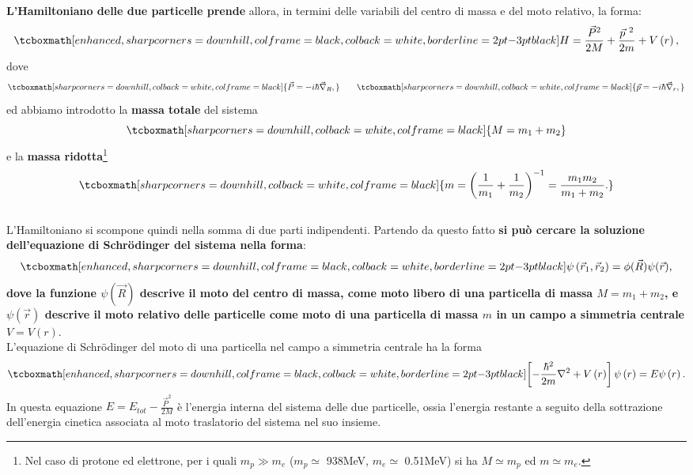 \textbf{L'Hamiltoniano delle due particelle prende} allora, in termini delle variabili del centro di massa e del moto relativo, la forma:
	\begin{equation}
		\tcboxmath[enhanced, sharp corners=downhill, colframe=black, colback=white, borderline={2pt}{-3pt}{black}]{
			H=\frac{\vec{P}^{2}}{2M}+\frac{\vec{p}^{\ 2}}{2m}+V\left(r\right) , 
			}
	\end{equation}
dove
	\begin{equation}
		\tcboxmath[sharp corners=downhill, colback=white, colframe=black]{
			\vec{P}=-i\hbar\vec{\nabla}_R,
			} \qquad
		\tcboxmath[sharp corners=downhill, colback=white, colframe=black]{
			\vec{p}=-i\hbar\vec{\nabla}_r ,
			}
\end{equation}
ed abbiamo introdotto la \textbf{massa totale} del sistema
	\begin{equation}
		\tcboxmath[sharp corners=downhill, colback=white, colframe=black]{
			M=m_1+m_2
			}
	\end{equation}
e la \textbf{massa ridotta}\footnote{Nel caso di protone ed elettrone, per i quali $m_p \gg m_e$ ($m_p \simeq$ 938MeV, $m_e\simeq$ 0.51MeV) si ha $M\simeq m_p$ ed $m\simeq m_e$.}
	\begin{equation}
		\tcboxmath[sharp corners=downhill, colback=white, colframe=black]{
			m=\left(\frac{1}{m_1}+\frac{1}{m_2}\right)^{-1}=\frac{m_1m_2}{m_1+m_2}.
			}
	\end{equation}\\
	
L'Hamiltoniano si scompone quindi nella somma di due parti indipendenti. Partendo da questo fatto \textbf{si può cercare la soluzione dell'equazione di Schr\"{o}dinger del sistema nella forma}:
	\begin{equation}
		\tcboxmath[enhanced, sharp corners=downhill, colframe=black, colback=white, borderline={2pt}{-3pt}{black}]{
			\psi\left(\vec{r}_1,\vec{r}_2\right)=\phi(\vec{R})\psi(\vec{r}) ,
			}
	\end{equation}
\textbf{dove la funzione $\psi (\vec{R} )$ descrive il moto del centro di massa, come moto libero di una particella di massa $M=m_1+m_2$, e $\psi\left(\vec{r}\right)$ descrive il moto relativo delle particelle come moto di una particella di massa $m$ in un campo a simmetria centrale $V=V\left(r\right)$}.\\

L'equazione di Schr\"{o}dinger del moto di una particella nel campo a simmetria centrale ha la forma
	\begin{equation}
		\tcboxmath[enhanced, sharp corners=downhill, colframe=black, colback=white, borderline={2pt}{-3pt}{black}]{
			\left[-\frac{\hbar^2}{2m}\nabla^2+V\left( r \right) \right]\psi\left(r\right)=E\psi\left(r\right).
			}
	\label{21.1}
	\end{equation} 
In questa equazione \textbf{$E=E_{tot}-\frac{\vec{P}^2}{2M}$} è l'energia interna del sistema delle due particelle, ossia l'energia restante a seguito della sottrazione dell'energia cinetica associata al moto traslatorio del sistema nel suo insieme.\\ 

